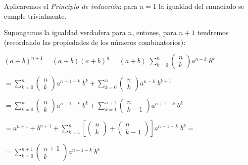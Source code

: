 		\begin{proofw}\renewcommand{\qedsymbol}{$\diamond$}
		
				Aplicaremos el \emph{Principio de inducción}: para $n=1$ la igualdad del enunciado se cumple  trivialmente.
				
				Supongamos la igualdad verdadera para $n$, entones, para $n+1$ tendremos (recordando las propiedades de los números combinatorios):
				
				\hspace{25mm}$(a+b)^{n+1}=(a+b)(a+b)^n=(a+b)\; \sum_{k=0}^n {\left( \begin{matrix} n \\ k \end{matrix}  \right)a^{n-k}\; b^k}=$
				
			    \hspace{25mm}$={\sum_{k=0}^n \left( \begin{matrix} n \\ k \end{matrix}  \right)a^{n+1-k}\; b^k}+\sum_{k=0}^n {\left( \begin{matrix} n \\ k \end{matrix}  \right)a^{n-k}\; b^{k+1}}$
				
				\hspace{25mm}$ =\sum_{k=0}^n {\left( \begin{matrix} n \\ k \end{matrix}  \right)a^{n+1-k}\; b^k}+\sum_{k=1}^{n+1} {\left( \begin{matrix} n \\ k-1 \end{matrix}  \right)a^{n+1-k}\; b^{k}} $
				
				\hspace{25mm} $ = a^{n+1}+b^{n+1}+\sum_{k=1}^n 
				\left[ \left( \begin{matrix} n \\ k \end{matrix}  \right) + \left( \begin{matrix} n \\ k-1 \end{matrix}  \right)    \right]a^{n+1-k}\; b^k=$
				
				\hspace{25mm} $=\sum_{k=0}^{n+1} {\left( \begin{matrix} n+1 \\ k \end{matrix}  \right)a^{n+1-k}\; b^k}$
				
		\end{proofw}
		
